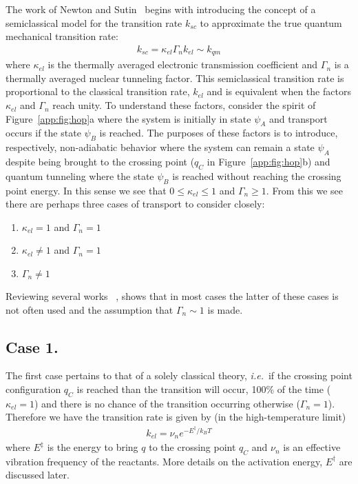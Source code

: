 The work of Newton and Sutin~\cite{brunschwig1980semiclassical} begins with introducing the concept of a semiclassical model for the transition rate $k_{sc}$ to approximate the true quantum mechanical transition rate:
\begin{align}
    k_{sc} = \kappa_{el}\Gamma_nk_{el} \sim k_{qm}
    \label{eq:ksc_general}
\end{align}
where $\kappa_{el}$ is the thermally averaged electronic transmission coefficient and $\Gamma_n$ is a thermally averaged nuclear tunneling factor. This semiclassical transition rate is proportional to the classical transition rate, $k_{el}$ and is equivalent when the factors $\kappa_{el}$ and $\Gamma_n$ reach unity. To understand these factors, consider the spirit of Figure~\ref{app:fig:hop}a where the system is initially in state $\psi_A$ and transport occurs if the state $\psi_B$ is reached. The purposes of these factors is to introduce, respectively, non-adiabatic behavior where the system can remain a state $\psi_A$ despite being brought to the crossing point ($q_C$ in Figure~\ref{app:fig:hop}b) and quantum tunneling where the state $\psi_B$ is reached without reaching the crossing point energy. In this sense we see that $0 \leq \kappa_{el} \leq 1$ and $\Gamma_n \geq 1$. From this we see there are perhaps three cases of transport to consider closely:
\begin{enumerate}
    \item $\kappa_{el} = 1$ and $\Gamma_n = 1$
    \item $\kappa_{el} \neq 1$ and $\Gamma_n = 1$
    \item $\Gamma_n \neq 1$
\end{enumerate}
Reviewing several works ~\cite{rosso2003an,deskins2007electron,oberhofer2012revisiting,gajdos2013inapplicability,blumberger2013constrained}, shows that in most cases the latter of these cases is not often used and the assumption that $\Gamma_n \sim 1$ is made.

\subsection{Case 1.}
The first case pertains to that of a solely classical theory, \textit{i.e.}\ if the crossing point configuration $q_C$ is reached than the transition will occur, 100\% of the time ($\kappa_{el} = 1$) and there is no chance of the transition occurring otherwise ($\Gamma_n = 1$). Therefore we have the transition rate is given by (in the high-temperature limit)
\begin{align}
    k_{el} = \nu_n e^{-E^\ddagger/k_B T}
    \label{eq:kclass}
\end{align}
where $E^\ddagger$ is the energy to bring $q$ to the crossing point $q_C$ and $\nu_n$ is an effective vibration frequency of the reactants. More details on the activation energy, $E^\dagger$ are discussed later.

